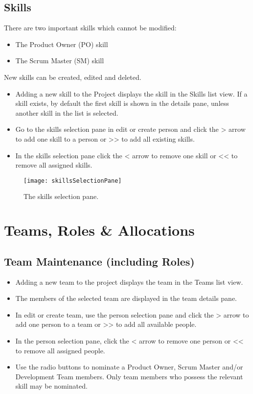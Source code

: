 \documentclass[11pt,fleqn]{book} %
\begin{document}
\subsection{Skills}
There are two important skills which cannot be modified: 
\begin{itemize}
  \item The Product Owner (PO) skill
  \item The Scrum Master (SM) skill
\end{itemize}
New skills can be created, edited and deleted.
\begin{itemize}
  \item Adding a new skill to the Project displays the skill in the Skills list view. If a skill exists, by default the
  first skill is shown in the details pane, unless another skill in the list is selected.
  \item Go to the skills selection pane in edit or create person and click the > arrow to add one skill to a person
  or >> to add all existing skills.
  \item In the skills selection pane click the < arrow to remove one skill or << to remove all assigned skills.
\end{itemize}

\begin{figure}[H]
  \centering
  \texttt{[image: skillsSelectionPane]}
  \caption{The skills selection pane.\label{skillsSelectionPane}}
\end{figure}

\section{Teams, Roles \& Allocations}
\subsection{Team Maintenance (including Roles)}
\begin{itemize}
  \item Adding a new team to the project displays the team in the Teams list view.
  \item The members of the selected team are displayed in the team details pane.
  \item In edit or create team, use the person selection pane and click the > arrow to add one person to a team
  or >> to add all available people.
  \item In the person selection pane, click the < arrow to remove one person or << to remove all assigned people.
  \item Use the radio buttons to nominate a Product Owner, Scrum Master and/or Development Team members. Only team members who
   possess the relevant skill may be nominated.
\end{itemize}
\end{document}
